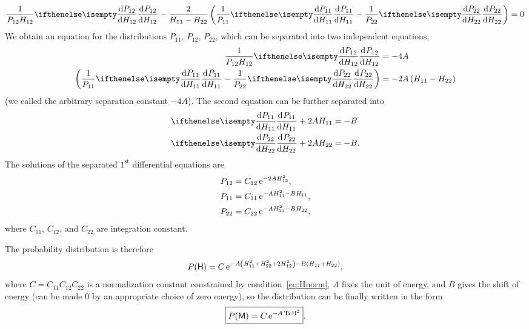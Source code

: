 \documentclass[a4paper,11pt,twoside]{article}
\begin{document}
            \begin{equation}
                \frac{1}{P_{12}H_{12}}\derivative{P_{12}}{H_{12}}-\frac{2}{H_{11}-H_{22}}
                \left(\frac{1}{P_{11}}\derivative{P_{11}}{H_{11}}-\frac{1}{P_{22}}\derivative{P_{22}}{H_{22}}\right)=0
            \end{equation}
            We obtain an equation for the distributions $P_{11}$, $P_{12}$, $P_{22}$, which can be separated into two independent equations,
            \begin{align}
                \frac{1}{P_{12}H_{12}}\derivative{P_{12}}{H_{12}}
                    &=-4A\nonumber\\
                \left(\frac{1}{P_{11}}\derivative{P_{11}}{H_{11}}-\frac{1}{P_{22}}\derivative{P_{22}}{H_{22}}\right)
                    &=-2A\left(H_{11}-H_{22}\right)
            \end{align}
            (we called the arbitrary separation constant $-4A$).
            The second equation can be further separated into
            \begin{align}
                \derivative{P_{11}}{H_{11}}+2AH_{11}&=-B\nonumber\\
                \derivative{P_{22}}{H_{22}}+2AH_{22}&=-B.
            \end{align}
            The solutions of the separated $1^{\text{st}}$ differential equations are
            \begin{align}
                P_{12}&=C_{12}\operatorname{e}^{-2AH_{12}^{2}},\nonumber\\
                P_{11}&=C_{11}\operatorname{e}^{-AH_{11}^{2}-BH_{11}},\\
                P_{22}&=C_{22}\operatorname{e}^{-AH_{22}^{2}-BH_{22}},
            \end{align}
            where $C_{11}$, $C_{12}$, and $C_{22}$ are integration constant.

            The probability distribution is therefore
            \begin{equation}
                \label{eq:PHelements}
                P(\mathsf{H})=C\operatorname{e}^{-A\left(H_{11}^{2}+H_{22}^{2}+2H_{12}^{2}\right)-B\left(H_{11}+H_{22}\right)},
            \end{equation}
            where $C=C_{11}C_{12}C_{22}$ is a normalization constant constrained by condition~\eqref{eq:Hnorm}, $A$ fixes the unit of energy, and $B$ gives the shift of energy (can be made $0$ by an appropriate choice of zero energy), so the distribution can be finally written in the form
            \begin{equation}
                \label{eq:PH}
                \boxed{P(\mathsf{M})=C\operatorname{e}^{-A\operatorname{Tr}\mathsf{H}^{2}}}.
            \end{equation}
\end{document}
